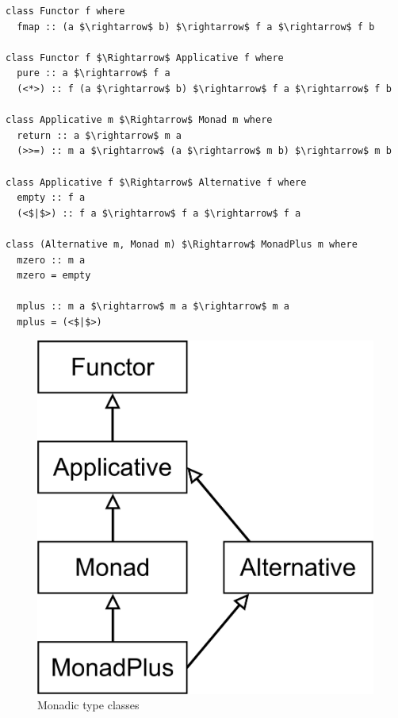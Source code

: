 \begin{minipage}{0.6\linewidth}
\begin{lstlisting}[style=HaskellStyle, caption={Monadic type classes}, label={lst:type-classes-for-monads}, captionpos=b, numbers=none]
class Functor f where
  fmap :: (a $\rightarrow$ b) $\rightarrow$ f a $\rightarrow$ f b

class Functor f $\Rightarrow$ Applicative f where
  pure :: a $\rightarrow$ f a
  (<*>) :: f (a $\rightarrow$ b) $\rightarrow$ f a $\rightarrow$ f b

class Applicative m $\Rightarrow$ Monad m where
  return :: a $\rightarrow$ m a
  (>>=) :: m a $\rightarrow$ (a $\rightarrow$ m b) $\rightarrow$ m b

class Applicative f $\Rightarrow$ Alternative f where
  empty :: f a
  (<$|$>) :: f a $\rightarrow$ f a $\rightarrow$ f a

class (Alternative m, Monad m) $\Rightarrow$ MonadPlus m where
  mzero :: m a
  mzero = empty
  
  mplus :: m a $\rightarrow$ m a $\rightarrow$ m a
  mplus = (<$|$>)
\end{lstlisting}
\end{minipage}
\begin{minipage}{0.4\linewidth}
	\begin{figure}[H]
		\begin{center}
			\includegraphics[width=\textwidth]{figures/Monadic-type-classes.png}
		\end{center}
		\caption{Monadic type classes}
		\label{fig:type-classes-for-monads}
	\end{figure}
\end{minipage}

